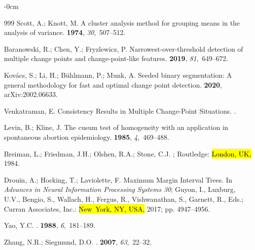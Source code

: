 \documentclass[algorithms,article,accept,oneauthor]{Definitions/mdpi}
\begin{document}
\begin{adjustwidth}{-\extralength}{0cm}
\begin{thebibliography}{999}
Scott, A.; Knott, M.
\newblock A cluster analysis method for grouping means in the analysis of
  variance.
 {\bf 1974}, {\em 30},~507--512.

Baranowski, R.; Chen, Y.; Fryzlewicz, P.
\newblock Narrowest-over-threshold detection of multiple change points and
  change-point-like features.
 {\bf 2019}, {\em 81},~649--672.

Kov{\'a}cs, S.; Li, H.; B{\"u}hlmann, P.; Munk, A.
\newblock Seeded binary segmentation: A general methodology for fast and
  optimal change point detection.
 {\bf 2020}, arXiv:2002.06633.

Venkatraman, E.
\newblock Consistency Results in Multiple Change-Point Situations.
.

Levin, B.; Kline, J.
\newblock The cusum test of homogeneity with an application in spontaneous
  abortion epidemiology.
 {\bf 1985}, {\em 4},~469--488.

Breiman, L.; Friedman, J.H.; Olshen, R.A.; Stone, C.J.
; Routledge: \hl{London, UK,} 1984.

Drouin, A.; Hocking, T.; Laviolette, F.
\newblock Maximum Margin Interval Trees. In {\em Advances in Neural Information
  Processing Systems 30}; Guyon, I., Luxburg, U.V., Bengio, S., Wallach, H.,
  Fergus, R., Vishwanathan, S., Garnett, R., Eds.; Curran Associates, Inc.: \hl{New~York, NY, USA,}  2017; pp. 4947--4956.

Yao, Y.C.
.
 {\bf 1988}, {\em
  6},~181--189.

Zhang, N.R.; Siegmund, D.O.
.
 {\bf 2007}, {\em 63},~22--32.


\end{thebibliography}
\end{adjustwidth}
\end{document}
